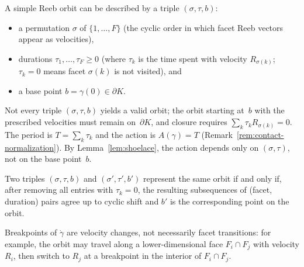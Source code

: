 \begin{remark}\label{rem:simple-orbit-data}
A simple Reeb orbit can be described by a triple $(\sigma, \tau, b)$:
\begin{itemize}
\item a permutation $\sigma$ of $\{1, \ldots, F\}$
  (the cyclic order in which facet Reeb vectors appear as velocities),
\item durations $\tau_1, \ldots, \tau_F \geq 0$
  (where $\tau_k$ is the time spent with velocity $R_{\sigma(k)}$;
  $\tau_k = 0$ means facet $\sigma(k)$ is not visited), and
\item a base point $b = \gamma(0) \in \partial K$.
\end{itemize}
Not every triple $(\sigma, \tau, b)$ yields a valid orbit;
the orbit starting at~$b$ with the prescribed velocities must
remain on~$\partial K$, and closure requires
$\sum_k \tau_k R_{\sigma(k)} = 0$.
The period is $T = \sum_k \tau_k$ and the action is $A(\gamma) = T$
(Remark~\ref{rem:contact-normalization}).
By Lemma~\ref{lem:shoelace}, the action depends only on
$(\sigma, \tau)$, not on the base point~$b$.

Two triples $(\sigma, \tau, b)$ and $(\sigma', \tau', b')$
represent the same orbit if and only if, after removing all entries
with $\tau_k = 0$, the resulting subsequences of (facet, duration)
pairs agree up to cyclic shift and $b'$ is the corresponding
point on the orbit.

Breakpoints of $\dot{\gamma}$ are velocity changes, not necessarily
facet transitions: for example, the orbit may travel along a
lower-dimensional face $F_i \cap F_j$ with velocity $R_i$, then
switch to $R_j$ at a breakpoint in the interior of $F_i \cap F_j$.
\end{remark}


